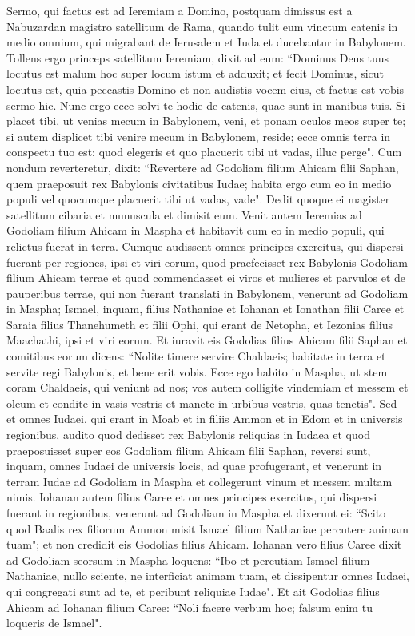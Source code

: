 \begin{biblechapter}  
\verse Sermo, qui factus est ad Ieremiam a Domino, postquam dimissus est a Nabuzardan magistro satellitum de Rama, quando tulit eum vinctum catenis in medio omnium, qui migrabant de Ierusalem et Iuda et ducebantur in Babylonem.  
\verse Tollens ergo princeps satellitum Ieremiam, dixit ad eum: “Dominus Deus tuus locutus est malum hoc super locum istum 
\verse et adduxit; et fecit Dominus, sicut locutus est, quia peccastis Domino et non audistis vocem eius, et factus est vobis sermo hic. 
\verse Nunc ergo ecce solvi te hodie de catenis, quae sunt in manibus tuis. Si placet tibi, ut venias mecum in Babylonem, veni, et ponam oculos meos super te; si autem displicet tibi venire mecum in Babylonem, reside; ecce omnis terra in conspectu tuo est: quod elegeris et quo placuerit tibi ut vadas, illuc perge". 
\verse Cum nondum reverteretur, dixit: “Revertere ad Godoliam filium Ahicam filii Saphan, quem praeposuit rex Babylonis civitatibus Iudae; habita ergo cum eo in medio populi vel quocumque placuerit tibi ut vadas, vade". Dedit quoque ei magister satellitum cibaria et munuscula et dimisit eum.  
\verse Venit autem Ieremias ad Godoliam filium Ahicam in Maspha et habitavit cum eo in medio populi, qui relictus fuerat in terra. 
\verse Cumque audissent omnes principes exercitus, qui dispersi fuerant per regiones, ipsi et viri eorum, quod praefecisset rex Babylonis Godoliam filium Ahicam terrae et quod commendasset ei viros et mulieres et parvulos et de pauperibus terrae, qui non fuerant translati in Babylonem, 
\verse venerunt ad Godoliam in Maspha; Ismael, inquam, filius Nathaniae et Iohanan et Ionathan filii Caree et Saraia filius Thanehumeth et filii Ophi, qui erant de Netopha, et Iezonias filius Maachathi, ipsi et viri eorum. 
\verse Et iuravit eis Godolias filius Ahicam filii Saphan et comitibus eorum dicens: “Nolite timere servire Chaldaeis; habitate in terra et servite regi Babylonis, et bene erit vobis. 
\verse Ecce ego habito in Maspha, ut stem coram Chaldaeis, qui veniunt ad nos; vos autem colligite vindemiam et messem et oleum et condite in vasis vestris et manete in urbibus vestris, quas tenetis". 
\verse Sed et omnes Iudaei, qui erant in Moab et in filiis Ammon et in Edom et in universis regionibus, audito quod dedisset rex Babylonis reliquias in Iudaea et quod praeposuisset super eos Godoliam filium Ahicam filii Saphan, 
\verse reversi sunt, inquam, omnes Iudaei de universis locis, ad quae profugerant, et venerunt in terram Iudae ad Godoliam in Maspha et collegerunt vinum et messem multam nimis. 
\verse Iohanan autem filius Caree et omnes principes exercitus, qui dispersi fuerant in regionibus, venerunt ad Godoliam in Maspha 
\verse et dixerunt ei: “Scito quod Baalis rex filiorum Ammon misit Ismael filium Nathaniae percutere animam tuam"; et non credidit eis Godolias filius Ahicam. 
\verse Iohanan vero filius Caree dixit ad Godoliam seorsum in Maspha loquens: “Ibo et percutiam Ismael filium Nathaniae, nullo sciente, ne interficiat animam tuam, et dissipentur omnes Iudaei, qui congregati sunt ad te, et peribunt reliquiae Iudae". 
\verse Et ait Godolias filius Ahicam ad Iohanan filium Caree: “Noli facere verbum hoc; falsum enim tu loqueris de Ismael". 
\end{biblechapter}

